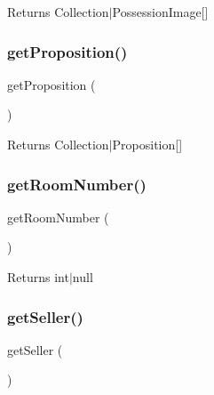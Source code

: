 \begin{DoxyReturn}{Returns}
Collection$\vert$\+Possession\+Image\mbox{[}\mbox{]} 
\end{DoxyReturn}
\mbox{\label{class_app_1_1_entity_1_1_possession_aa37187d64f069bb4138a898dc861dcc9}} 
\subsubsection{\texorpdfstring{getProposition()}{getProposition()}}
{\footnotesize\ttfamily get\+Proposition (\begin{DoxyParamCaption}{ }\end{DoxyParamCaption})}

\begin{DoxyReturn}{Returns}
Collection$\vert$\+Proposition\mbox{[}\mbox{]} 
\end{DoxyReturn}
\mbox{\label{class_app_1_1_entity_1_1_possession_a28200e288472aeb29690a46b55956cec}} 
\subsubsection{\texorpdfstring{getRoomNumber()}{getRoomNumber()}}
{\footnotesize\ttfamily get\+Room\+Number (\begin{DoxyParamCaption}{ }\end{DoxyParamCaption})}

\begin{DoxyReturn}{Returns}
int$\vert$null 
\end{DoxyReturn}
\mbox{\label{class_app_1_1_entity_1_1_possession_aa04e7c373d84d417cd93dc9189ea7c81}} 
\subsubsection{\texorpdfstring{getSeller()}{getSeller()}}
{\footnotesize\ttfamily get\+Seller (\begin{DoxyParamCaption}{ }\end{DoxyParamCaption})}

